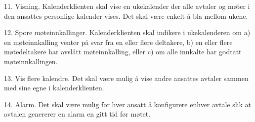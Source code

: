 11. Visning. Kalenderklienten skal vise en ukekalender der alle avtaler og møter i den
ansattes personlige kalender vises. Det skal være enkelt å bla mellom ukene.


12. Spore møteinnkallinger. Kalenderklienten skal indikere i ukekalenderen om a) en
møteinnkalling venter på svar fra en eller flere deltakere, b) en eller flere
møtedeltakere har avslått møteinnkalling, eller c) om alle innkalte har godtatt
møteinnkallingen.


13. Vis flere kalendre. Det skal være mulig å vise andre ansattes avtaler sammen med sine
egne i kalenderklienten.


14. Alarm. Det skal være mulig for hver ansatt å konfigurere enhver avtale slik at avtalen
genererer en alarm en gitt tid før møtet.

